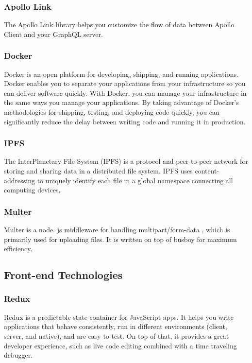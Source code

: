     \subsubsection{Apollo Link}
    The Apollo Link library helps you customize the flow of data between Apollo Client and your GraphQL server.

    \subsubsection{Docker}
    Docker is an open platform for developing, shipping, and running applications. 
    Docker enables you to separate your applications from your infrastructure so you can deliver software quickly. 
    With Docker, you can manage your infrastructure in the same ways you manage your applications. 
    By taking advantage of Docker’s methodologies for shipping, testing, and deploying code quickly, 
    you can significantly reduce the delay between writing code and running it in production.

    \subsubsection{IPFS}
    The InterPlanetary File System (IPFS) is a protocol and peer-to-peer network for storing and sharing data in a distributed file system. 
    IPFS uses content-addressing to uniquely identify each file in a global namespace connecting all computing devices.

    \subsubsection{Multer}
    Multer is a node. js middleware for handling multipart/form-data , 
    which is primarily used for uploading files. It is written on top of busboy for maximum efficiency.

\subsection{Front-end Technologies}

    \subsubsection{Redux}
    Redux is a predictable state container for JavaScript apps.
    It helps you write applications that behave consistently, run in different environments 
    (client, server, and native), and are easy to test. On top of that, it provides a great developer experience, 
    such as live code editing combined with a time traveling debugger.
    

